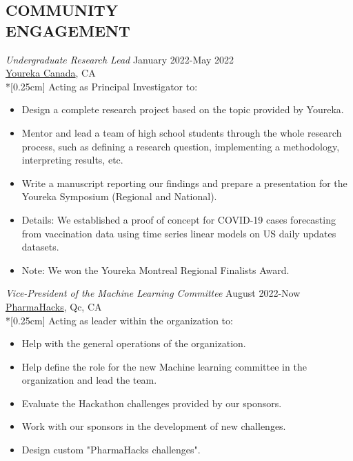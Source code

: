 \documentclass[margin, 10pt]{res} %
\begin{document}
\begin{resume}
		
		\section{COMMUNITY \\ ENGAGEMENT}
		{\sl Undergraduate Research Lead} \hfill January 2022-May 2022\\ \href{https://yourekacanada.org/}{Youreka Canada}, CA\\*[0.25cm] 
		Acting as Principal Investigator to:
		\vspace*{0.15cm}
		\begin{itemize}\itemsep -2pt %
			\item Design a complete research project based on the topic provided by Youreka.
			\item Mentor and lead a team of high school students through the whole research process, such as defining a research question, implementing a methodology, interpreting results, etc.
			\item Write a manuscript reporting our findings and prepare a presentation for the Youreka Symposium (Regional and National).
			\item[\ding{71}] Details: We established a proof of concept for COVID-19 cases forecasting from vaccination data using time series linear models on US daily updates datasets.
			\item[\ding{72}] Note: We won the Youreka Montreal Regional Finalists Award.
		\end{itemize}
		
		{\sl Vice-President of the Machine Learning Committee} \hfill August 2022-Now\\ \href{https://pharmahacks.com/}{PharmaHacks}, Qc, CA\\*[0.25cm] 
		Acting as leader within the organization to:
		\vspace*{0.15cm}
		\begin{itemize}\itemsep -2pt %
			\item Help with the general operations of the organization.
			\item Help define the role for the new Machine learning committee in the organization and lead the team.
			\item Evaluate the Hackathon challenges provided by our sponsors.
			\item Work with our sponsors in the development of new challenges.
			\item Design custom "PharmaHacks challenges".  
		\end{itemize}
		

\end{resume}
\end{document}
